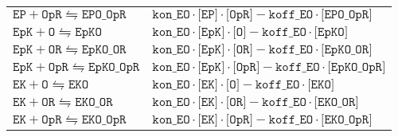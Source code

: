 \begin{tabular}{ll}
$ \texttt{EP}  +  \texttt{OpR}  \leftrightharpoons  \texttt{EPO\_OpR}  $ & $ \texttt{kon\_EO}  \cdot  \texttt{[EP]}  \cdot  \texttt{[OpR]}  -  \texttt{koff\_EO}  \cdot  \texttt{[EPO\_OpR]}  $ \\
$ \texttt{EpK}  +  \texttt{O}  \leftrightharpoons  \texttt{EpKO}  $ & $ \texttt{kon\_EO}  \cdot  \texttt{[EpK]}  \cdot  \texttt{[O]}  -  \texttt{koff\_EO}  \cdot  \texttt{[EpKO]}  $ \\
$ \texttt{EpK}  +  \texttt{OR}  \leftrightharpoons  \texttt{EpKO\_OR}  $ & $ \texttt{kon\_EO}  \cdot  \texttt{[EpK]}  \cdot  \texttt{[OR]}  -  \texttt{koff\_EO}  \cdot  \texttt{[EpKO\_OR]}  $ \\
$ \texttt{EpK}  +  \texttt{OpR}  \leftrightharpoons  \texttt{EpKO\_OpR}  $ & $ \texttt{kon\_EO}  \cdot  \texttt{[EpK]}  \cdot  \texttt{[OpR]}  -  \texttt{koff\_EO}  \cdot  \texttt{[EpKO\_OpR]}  $ \\
$ \texttt{EK}  +  \texttt{O}  \leftrightharpoons  \texttt{EKO}  $ & $ \texttt{kon\_EO}  \cdot  \texttt{[EK]}  \cdot  \texttt{[O]}  -  \texttt{koff\_EO}  \cdot  \texttt{[EKO]}  $ \\
$ \texttt{EK}  +  \texttt{OR}  \leftrightharpoons  \texttt{EKO\_OR}  $ & $ \texttt{kon\_EO}  \cdot  \texttt{[EK]}  \cdot  \texttt{[OR]}  -  \texttt{koff\_EO}  \cdot  \texttt{[EKO\_OR]}  $ \\
$ \texttt{EK}  +  \texttt{OpR}  \leftrightharpoons  \texttt{EKO\_OpR}  $ & $ \texttt{kon\_EO}  \cdot  \texttt{[EK]}  \cdot  \texttt{[OpR]}  -  \texttt{koff\_EO}  \cdot  \texttt{[EKO\_OpR]}  $ \\
\end{tabular}